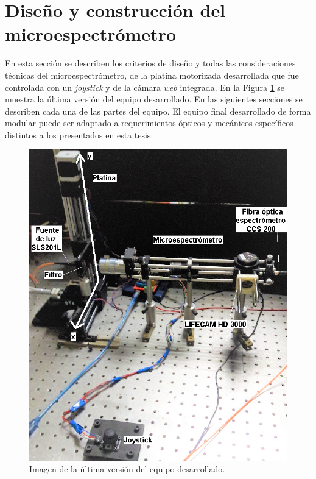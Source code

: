 \singlespacing
\section{Diseño y construcción del microespectrómetro}
\label{sec:montcontmsp}

\hspace{0.5cm}En esta sección se describen los criterios de diseño y todas las consideraciones técnicas del microespectrómetro, de la platina motorizada desarrollada que fue controlada con un \textit{joystick} y de la cámara \textit{web} integrada. En la Figura \ref{fig:presequipo} se muestra la última versión del equipo desarrollado. En las siguientes secciones se describen cada una de las partes del equipo. El equipo final desarrollado de forma modular puede ser adaptado a requerimientos ópticos y mecánicos específicos distintos a los presentados en esta tesis.
\begin{figure}[H]
	\centering
	\includegraphics[scale=0.95]{Figs/microespectrometro/presentacion_equipo.png}
	\caption{Imagen de la última versión del equipo desarrollado.}
	\label{fig:presequipo}
\end{figure}



